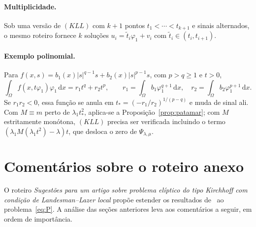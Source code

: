 \documentclass[11pt,a4paper]{article}
\theoremstyle{plain}
\theoremstyle{definition}
\theoremstyle{remark}
\newcommand{\abs}[1]{\lvert #1\rvert}
\newcommand{\dx}{\,\mathrm{d}x}
\begin{document}
\paragraph{Multiplicidade.} Sob uma versão de $(KLL)$ com $k+1$ pontos
$t_1<\cdots<t_{k+1}$ e sinais alternados, o mesmo roteiro fornece $k$ soluções
$u_i=\tilde t_i\varphi_1+v_i$ com $\tilde t_i\in(t_i,t_{i+1})$.

\paragraph{Exemplo polinomial.} Para $f(x,s)=b_1(x)\abs{s}^{q-1}s+b_2(x)\abs{s}^{p-1}s$,
com $p>q\ge1$ e $t>0$,
\[
\int_\Omega f(x,t\varphi_1)\varphi_1\dx=r_1t^q+r_2t^p,\qquad
r_1=\int_\Omega b_1\varphi_1^{q+1}\dx,\quad r_2=\int_\Omega b_2\varphi_1^{p+1}\dx .
\]
Se $r_1r_2<0$, essa função se anula em $t_*=(-r_1/r_2)^{1/(p-q)}$ e muda de
sinal ali. Com $M\equiv m$ perto de $\lambda_1t_*^2$, aplica-se a
Proposição~\ref{prop:patamar}; com $M$ estritamente monótona, $(KLL)$ precisa
ser verificada incluindo o termo $(\lambda_1M(\lambda_1t^2)-\lambda)t$, que
desloca o zero de $\Psi_{\lambda,\mu}$.

\section{Comentários sobre o roteiro anexo}\label{sec:critica}

O roteiro \emph{Sugestões para um artigo sobre problema elíptico do tipo
Kirchhoff com condição de Landesman--Lazer local} propõe estender os resultados
de~\cite{RezendeSanchezSilva2019} ao problema~\eqref{eq:P}. A análise das
seções anteriores leva aos comentários a seguir, em ordem de importância.
\end{document}
